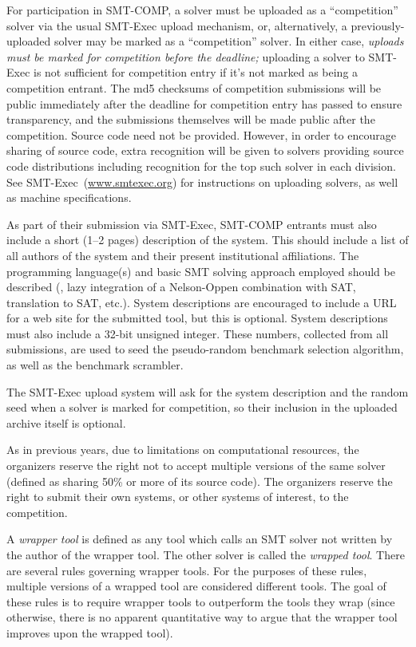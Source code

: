\documentclass[12pt]{article}
\begin{document}
For participation in SMT-COMP, a solver must be
uploaded as a ``competition'' solver via the usual SMT-Exec upload
mechanism, or, alternatively, a previously-uploaded solver may be
marked as a ``competition'' solver.  In either case, \emph{uploads
must be marked for competition before the deadline;} uploading a solver
to SMT-Exec is not sufficient for competition entry if it's not marked
as being a competition entrant.  The md5 checksums of competition
submissions will be public immediately after the deadline for competition
entry has passed to ensure transparency, and the submissions themselves
will be made public after the competition.  Source code need not be
provided.  However, in order to encourage sharing of source code, extra
recognition will be given to solvers providing source code distributions
including recognition for the top such solver in each division.  See
SMT-Exec~(\url{www.smtexec.org}) for instructions on uploading solvers, as well
as machine specifications.

As part of their submission via SMT-Exec,
SMT-COMP entrants must also include a short (1--2 pages) description of
the system.  This should include a list of all authors of the system
and their present institutional affiliations.  The programming
language(s) and basic SMT solving approach employed should be
described (\eg, lazy integration of a Nelson-Oppen combination with
SAT, translation to SAT, etc.).  System descriptions are encouraged to
include a URL for a web site for the submitted tool, but this is
optional.  System descriptions must also include a 32-bit unsigned
integer.  These numbers, collected from all submissions, are used
to seed the pseudo-random benchmark selection algorithm, as well
as the benchmark scrambler.

The SMT-Exec upload system will ask for the system description and
the random seed when a solver is marked for competition, so
their inclusion in the uploaded archive itself is optional.

As in previous years, due to limitations on
computational resources, the organizers reserve the right not to
accept multiple versions of the same solver (defined as sharing 50\%
or more of its source code).  The organizers reserve the right to
submit their own systems, or other systems of interest, to the
competition.

A \emph{wrapper tool} is defined as any tool
which calls an SMT solver not written by the author of the wrapper
tool.  The other solver is called the \emph{wrapped tool}.  There are
several rules governing wrapper tools.  For the purposes of these rules,
multiple versions of a wrapped tool are considered different tools.
The goal of these rules is to require wrapper tools to outperform the
tools they wrap (since otherwise, there is no apparent quantitative
way to argue that the wrapper tool improves upon the wrapped tool).
\end{document}
